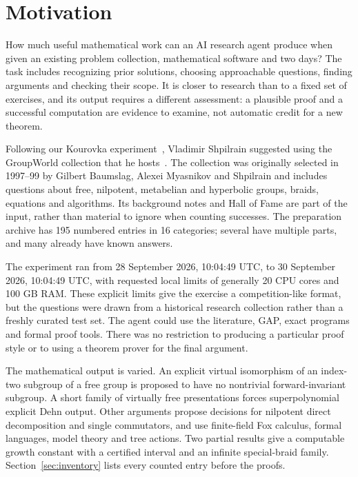 \section{Motivation}\label{sec:motivation}

How much useful mathematical work can an AI research agent produce when
given an existing problem collection, mathematical software and two days?
The task includes recognizing prior solutions, choosing approachable
questions, finding arguments and checking their scope. It is closer to
research than to a fixed set of exercises, and its output requires a
different assessment: a plausible proof and a successful computation are
evidence to examine, not automatic credit for a new theorem.

Following our Kourovka experiment~\cite{kourovka-paper,kourovka-repo},
Vladimir Shpilrain suggested using the GroupWorld collection that he
hosts~\cite{groupworld}. The collection was originally selected in
1997--99 by Gilbert Baumslag, Alexei Myasnikov and Shpilrain and includes
questions about free, nilpotent, metabelian and hyperbolic groups, braids,
equations and algorithms. Its background notes and Hall of Fame are part
of the input, rather than material to ignore when counting successes.
The preparation archive has 195 numbered entries in 16 categories;
several have multiple parts, and many already have known answers.

The experiment ran from 28 September 2026, 10:04:49 UTC, to
30 September 2026, 10:04:49 UTC, with requested local limits of generally
20 CPU cores and 100 GB RAM. These explicit limits give the exercise a
competition-like format, but the questions were drawn from a historical
research collection rather than a freshly curated test set. The agent
could use the literature, GAP, exact programs and formal proof tools.
There was no restriction to producing a particular proof style or to
using a theorem prover for the final argument.

The mathematical output is varied. An explicit virtual isomorphism of
an index-two subgroup of a free group is proposed to have no nontrivial
forward-invariant subgroup. A short family of virtually free presentations
forces superpolynomial explicit Dehn output. Other arguments propose
decisions for nilpotent direct decomposition and single commutators,
and use finite-field Fox calculus, formal languages, model theory and
tree actions. Two partial results give a computable growth constant with
a certified interval and an infinite special-braid family. Section~\ref{sec:inventory}
lists every counted entry before the proofs.

